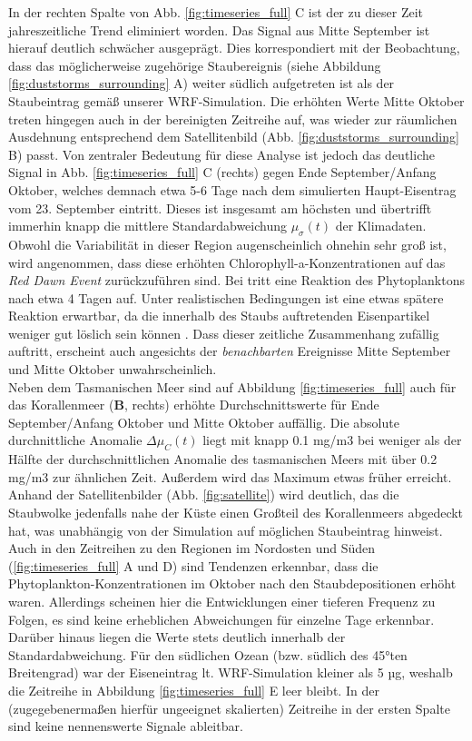 \documentclass[12pt,a4paper,onecolumn]{scrartcl}
\begin{document}
In der rechten Spalte von Abb. \ref{fig:timeseries_full} C ist der zu dieser Zeit jahreszeitliche Trend eliminiert worden. Das Signal aus Mitte September ist hierauf deutlich schwächer ausgeprägt. Dies korrespondiert mit der Beobachtung, dass das möglicherweise zugehörige Staubereignis (siehe Abbildung \ref{fig:duststorms_surrounding} A) weiter südlich aufgetreten ist als der Staubeintrag gemäß unserer WRF-Simulation. Die erhöhten Werte Mitte Oktober treten hingegen auch in der bereinigten Zeitreihe auf, was wieder zur räumlichen Ausdehnung entsprechend dem Satellitenbild (Abb. \ref{fig:duststorms_surrounding} B) passt. Von zentraler Bedeutung für diese Analyse ist jedoch das deutliche Signal in Abb. \ref{fig:timeseries_full} C (rechts) gegen Ende September/Anfang Oktober, welches demnach etwa 5-6 Tage nach dem simulierten Haupt-Eisentrag vom 23. September eintritt. Dieses ist insgesamt am höchsten und übertrifft immerhin knapp die mittlere Standardabweichung $\mu_\sigma(t)$ der Klimadaten. Obwohl die Variabilität in dieser Region augenscheinlich ohnehin sehr groß ist, wird angenommen, dass diese erhöhten Chlorophyll-a-Konzentrationen auf das \textit{Red Dawn Event} zurückzuführen sind. Bei \citet{Martin.1988} tritt eine Reaktion des Phytoplanktons nach etwa 4 Tagen auf. Unter realistischen Bedingungen ist eine etwas spätere Reaktion erwartbar, da die innerhalb des Staubs auftretenden Eisenpartikel weniger gut löslich sein können \citep{Shao.2011}. Dass dieser zeitliche Zusammenhang zufällig auftritt, erscheint auch angesichts der \textit{benachbarten} Ereignisse Mitte September und Mitte Oktober unwahrscheinlich. \\

Neben dem Tasmanischen Meer sind auf Abbildung \ref{fig:timeseries_full} auch für das Korallenmeer (\textbf{B}, rechts) erhöhte Durchschnittswerte für Ende September/Anfang Oktober und Mitte Oktober auffällig. Die absolute durchnittliche Anomalie $\Delta \mu_C(t)$ liegt mit knapp 0.1 mg/m3 bei weniger als der Hälfte der durchschnittlichen Anomalie des tasmanischen Meers mit über 0.2 mg/m3 zur ähnlichen Zeit. Außerdem wird das Maximum etwas früher erreicht. Anhand der Satellitenbilder (Abb. \ref{fig:satellite}) wird deutlich, das die Staubwolke jedenfalls nahe der Küste einen Großteil des Korallenmeers abgedeckt hat, was unabhängig von der Simulation auf möglichen Staubeintrag hinweist. Auch in den Zeitreihen zu den Regionen im Nordosten und Süden (\ref{fig:timeseries_full} A und D) sind Tendenzen erkennbar, dass die Phytoplankton-Konzentrationen im Oktober nach den Staubdepositionen erhöht waren. Allerdings scheinen hier die Entwicklungen einer tieferen Frequenz zu Folgen, es sind keine erheblichen Abweichungen für einzelne Tage erkennbar. Darüber hinaus liegen die Werte stets deutlich innerhalb der Standardabweichung. Für den südlichen Ozean (bzw. südlich des 45°ten Breitengrad) war der Eiseneintrag lt. WRF-Simulation kleiner als 5 µg, weshalb die Zeitreihe in Abbildung \ref{fig:timeseries_full} E leer bleibt. In der (zugegebenermaßen hierfür ungeeignet skalierten) Zeitreihe in der ersten Spalte sind keine nennenswerte Signale ableitbar.
\end{document}
